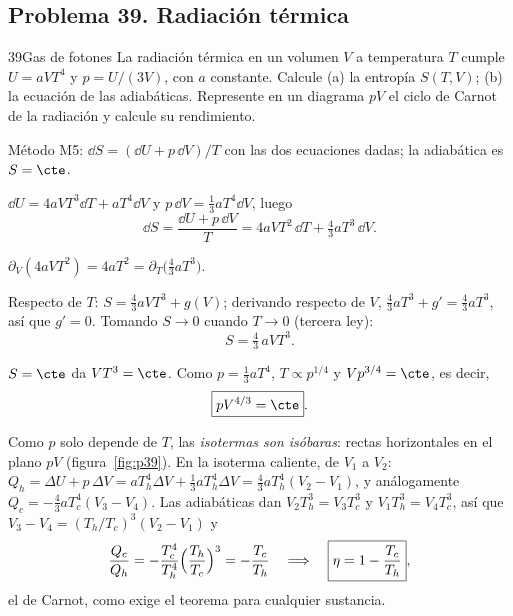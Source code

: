 \subsection{Problema 39. Radiación térmica}
\begin{problema}{39}{Gas de fotones}
La radiación térmica en un volumen $V$ a temperatura $T$ cumple $U=aVT^4$ y $p=U/(3V)$, con $a$ constante. Calcule
(a) la entropía $S(T,V)$; (b) la ecuación de las adiabáticas. Represente en un diagrama $pV$ el ciclo de Carnot de la
radiación y calcule su rendimiento.
\end{problema}

\begin{resolucion}
\idea Método M5: $\dd S=(\dd U+p\,\dd V)/T$ con las dos ecuaciones dadas; la adiabática es $S=\cte$.

 $\dd U=4aVT^3\dd T+aT^4\dd V$ y $p\,\dd V=\tfrac13aT^4\dd V$, luego
\[
  \dd S=\frac{\dd U+p\,\dd V}{T}=4aVT^2\,\dd T+\tfrac43aT^3\,\dd V .
\]

 $\partial_V(4aVT^2)=4aT^2=\partial_T\bigl(\tfrac43aT^3\bigr)$. \chk

 Respecto de $T$: $S=\tfrac43aVT^3+g(V)$; derivando respecto de $V$,
$\tfrac43aT^3+g'=\tfrac43aT^3$, así que $g'=0$. Tomando $S\to0$ cuando $T\to0$ (tercera ley):
\[
  \boxed{S=\tfrac43\,aVT^3}.
\]

 $S=\cte$ da $VT^3=\cte$. Como $p=\tfrac13aT^4$, $T\propto p^{1/4}$ y
$Vp^{3/4}=\cte$, es decir,
\[
  \boxed{pV^{4/3}=\cte}.
\]

 Como $p$ solo depende de $T$, las \emph{isotermas son isóbaras}: rectas horizontales en el plano
$pV$ (figura~\ref{fig:p39}). En la isoterma caliente, de $V_1$ a $V_2$:
$Q_h=\Delta U+p\,\Delta V=aT_h^4\Delta V+\tfrac13aT_h^4\Delta V=\tfrac43aT_h^4(V_2-V_1)$, y análogamente
$Q_c=-\tfrac43aT_c^4(V_3-V_4)$. Las adiabáticas dan $V_2T_h^3=V_3T_c^3$ y $V_1T_h^3=V_4T_c^3$, así que
$V_3-V_4=(T_h/T_c)^3(V_2-V_1)$ y
\[
  \frac{Q_c}{Q_h}=-\frac{T_c^4}{T_h^4}\Bigl(\frac{T_h}{T_c}\Bigr)^3=-\frac{T_c}{T_h}
  \quad\Longrightarrow\quad\boxed{\eta=1-\frac{T_c}{T_h}},
\]
el de Carnot, como exige el teorema para cualquier sustancia.
\end{resolucion}



